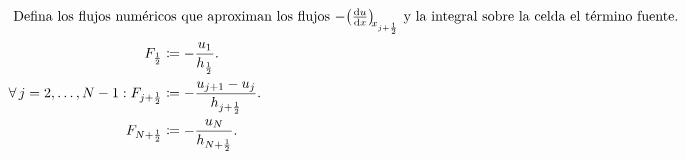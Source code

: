 \begin{frame}
\begin{align}
		\shortintertext{
			Defina los flujos numéricos que aproximan los flujos
			$-\diff{u}{x}[x_{j+\frac{1}{2}}]$ y la integral sobre la
			celda el término fuente.
		}
		F_{\frac{1}{2}}              & \coloneqq
		-\frac{u_{1}}{h_{\frac{1}{2}}}.           \\
		\forall j=2,\dotsc,N-1:
		F_{j+\frac{1}{2}}            & \coloneqq
		-\frac{u_{j+1}-u_{j}}{h_{j+\frac{1}{2}}}. \\
		F_{N+\frac{1}{2}}            & \coloneqq
		-\frac{u_{N}}{h_{N+\frac{1}{2}}}.
	\end{align}
\end{frame}

